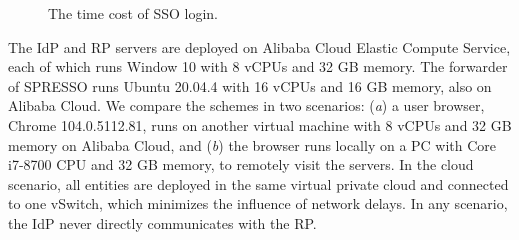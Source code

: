 \begin{figure}[tb]
  \centering
  \caption{The time cost of SSO login.}
  \label{fig:evaluation}
\end{figure}


The IdP and RP servers are deployed on Alibaba Cloud Elastic Compute Service,
      each of which runs Window 10 with 8 vCPUs and 32 GB memory.
The forwarder of SPRESSO runs Ubuntu 20.04.4 with 16 vCPUs and 16 GB memory,
    also on Alibaba Cloud.
We compare the schemes in two scenarios:
    (\emph{a}) a user browser, Chrome 104.0.5112.81, runs on another virtual machine with 8 vCPUs and 32 GB memory on Alibaba Cloud,
        and (\emph{b}) the browser runs locally on a PC with Core i7-8700 CPU and 32 GB memory, to remotely visit the servers.
In the cloud scenario, all entities are deployed in the same virtual private cloud and connected to one vSwitch,
    which minimizes the influence of network delays.
In any scenario, the IdP never directly communicates with the RP.


